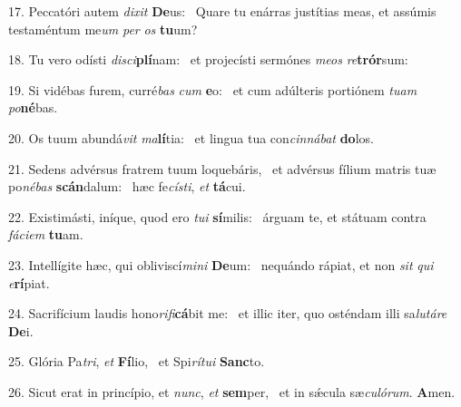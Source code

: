 17. Peccatóri autem \textit{di}\textit{xit} \textbf{De}us: \ast\  Quare tu enárras justítias meas, et assúmis testaméntum me\textit{um} \textit{per} \textit{os} \textbf{tu}um?\

18. Tu vero odísti \textit{di}\textit{sci}\textbf{plí}nam: \ast\  et projecísti sermónes \textit{me}\textit{os} \textit{re}\textbf{trór}sum:\

19. Si vidébas furem, curré\textit{bas} \textit{cum} \textbf{e}o: \ast\  et cum adúlteris portiónem \textit{tu}\textit{am} \textit{po}\textbf{né}bas.\

20. Os tuum abundá\textit{vit} \textit{ma}\textbf{lí}tia: \ast\  et lingua tua con\textit{cin}\textit{ná}\textit{bat} \textbf{do}los.\

21. Sedens advérsus fratrem tuum loquebáris, \dag\  et advérsus fílium matris tuæ po\textit{né}\textit{bas} \textbf{scán}dalum: \ast\  hæc fe\textit{cís}\textit{ti}, \textit{et} \textbf{tá}cui.\

22. Existimásti, iníque, quod ero \textit{tu}\textit{i} \textbf{sí}milis: \ast\  árguam te, et státuam contra \textit{fá}\textit{ci}\textit{em} \textbf{tu}am.\

23. Intellígite hæc, qui obliviscí\textit{mi}\textit{ni} \textbf{De}um: \ast\  nequándo rápiat, et non \textit{sit} \textit{qui} \textit{e}\textbf{rí}piat.\

24. Sacrifícium laudis hono\textit{ri}\textit{fi}\textbf{cá}bit me: \ast\  et illic iter, quo osténdam illi sa\textit{lu}\textit{tá}\textit{re} \textbf{De}i.\

25. Glória Pa\textit{tri}, \textit{et} \textbf{Fí}lio, \ast\  et Spi\textit{rí}\textit{tu}\textit{i} \textbf{Sanc}to.\

26. Sicut erat in princípio, et \textit{nunc}, \textit{et} \textbf{sem}per, \ast\  et in sǽcula sæ\textit{cu}\textit{ló}\textit{rum}. \textbf{A}men.\

